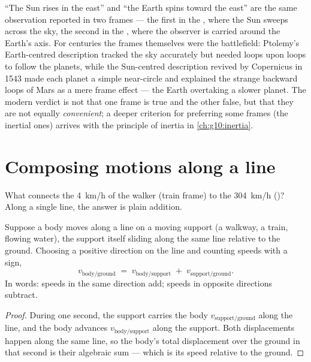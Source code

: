 \begin{remark}\label{rem:g10:relative-motion:history}
``The Sun rises in the east'' and ``the Earth spins toward the east'' are
the same observation reported in two frames --- the first in the , where the Sun sweeps across the sky, the second in the , where the observer is carried around the Earth's axis. For
centuries the frames themselves were the battlefield: Ptolemy's
Earth-centred description tracked the sky accurately but needed loops
upon loops to follow the planets, while the Sun-centred description
revived by Copernicus in 1543 made each planet a simple near-circle and
explained the strange backward loops of Mars as a mere frame effect ---
the Earth overtaking a slower planet. The modern verdict is not that one
frame is true and the other false, but that they are not equally
\emph{convenient}; a deeper criterion for preferring some frames
(the inertial ones) arrives with the principle of inertia in
\cref{ch:g10:inertia}.
\end{remark}

\section{Composing motions along a line}

What connects the \qty{4}{km/h} of the walker (train frame) to the
\qty{304}{km/h} ()? Along a single line, the answer is plain
addition.

\begin{proposition}\label{prop:g10:relative-motion:compose}
Suppose a body moves along a line on a moving support (a walkway, a
train, flowing water), the support itself sliding along the same line
relative to the ground. Choosing a positive direction on the line and
counting speeds with a sign,
\[
v_{\text{body/ground}} \;=\; v_{\text{body/support}} \;+\;
v_{\text{support/ground}} .
\]
In words: speeds in the same direction add; speeds in opposite
directions subtract.
\end{proposition}

\begin{proof}
During one second, the support carries the body $v_{\text{support/ground}}$
 along the line, and the body advances $v_{\text{body/support}}$
 along the support. Both displacements happen along the same line,
so the body's total displacement over the ground in that second is their
algebraic sum --- which is its speed relative to the ground.
\end{proof}

